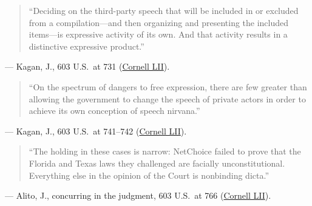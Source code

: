 \documentclass[12pt]{article}
\begin{document}
\begin{quote}
``Deciding on the third-party speech that will be included in or excluded from a compilation---and then organizing and presenting the included items---is expressive activity of its own. And that activity results in a distinctive expressive product.''
\end{quote}
\noindent --- Kagan, J., 603 U.S.\ at 731 (\href{https://www.law.cornell.edu/supremecourt/text/22-277}{Cornell LII}).

\begin{quote}
``On the spectrum of dangers to free expression, there are few greater than allowing the government to change the speech of private actors in order to achieve its own conception of speech nirvana.''
\end{quote}
\noindent --- Kagan, J., 603 U.S.\ at 741--742 (\href{https://www.law.cornell.edu/supremecourt/text/22-277}{Cornell LII}).

\begin{quote}
``The holding in these cases is narrow: NetChoice failed to prove that the Florida and Texas laws they challenged are facially unconstitutional. Everything else in the opinion of the Court is nonbinding dicta.''
\end{quote}
\noindent --- Alito, J., concurring in the judgment, 603 U.S.\ at 766 (\href{https://www.law.cornell.edu/supremecourt/text/22-277}{Cornell LII}).
\end{document}
